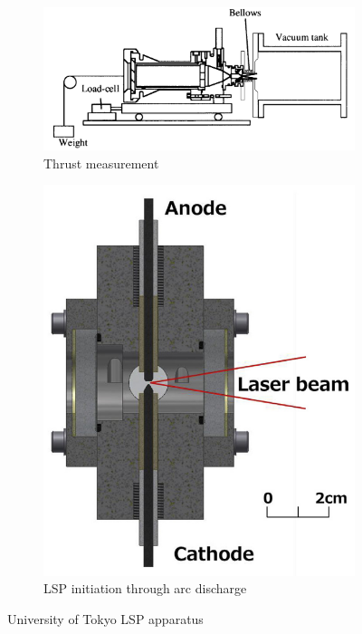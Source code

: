             \begin{figure}[h]
                \centering
                \begin{subfigure}[t]{0.60\textwidth}
                    \centering
                    \includegraphics[width=\textwidth]{assets/2 background/tokyo_thrust.png}
                    \caption{Thrust measurement \cite{toyodaThrustPerformanceCW2002}}
                    \label{fig:4_tokyoThrust}
                \end{subfigure}
                \hfill
                \begin{subfigure}[t]{0.35\textwidth}
                    \centering
                    \includegraphics[width=\textwidth]{assets/2 background/tokyo_arc.png}
                    \caption{LSP initiation through arc discharge \cite{matsuiGeneratingConditionsArgon2019}}
                    \label{fig:4_tokyoArc}
                \end{subfigure}
                \caption{University of Tokyo LSP apparatus}
                \label{fig:4_tokyo}
            \end{figure}

